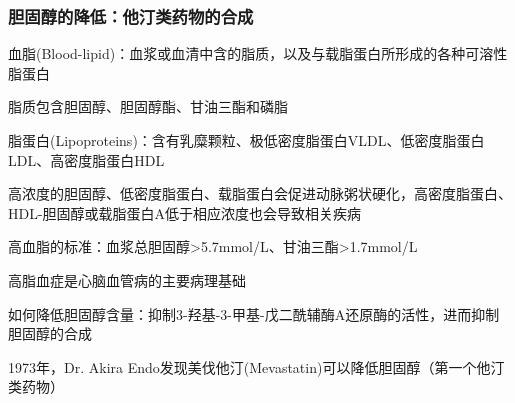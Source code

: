 \subsubsection*{胆固醇的降低：他汀类药物的合成}%
\label{subsub:胆固醇的降低-他汀类药物的合成}
\begin{notation}
    血脂(Blood-lipid)：血浆或血清中含的脂质，以及与载脂蛋白所形成的各种可溶性脂蛋白

    脂质包含胆固醇、胆固醇酯、甘油三酯和磷脂
\end{notation}
\begin{notation}
    脂蛋白(Lipoproteins)：含有乳糜颗粒、极低密度脂蛋白VLDL、低密度脂蛋白LDL、高密度脂蛋白HDL

    高浓度的胆固醇、低密度脂蛋白、载脂蛋白会促进动脉粥状硬化，高密度脂蛋白、HDL-胆固醇或载脂蛋白A低于相应浓度也会导致相关疾病
\end{notation}
\begin{notation}
    高血脂的标准：血浆总胆固醇>5.7mmol/L、甘油三酯>1.7mmol/L

    高脂血症是心脑血管病的主要病理基础

    如何降低胆固醇含量：抑制3-羟基-3-甲基-戊二酰辅酶A还原酶的活性，进而抑制胆固醇的合成

    1973年，Dr. Akira Endo发现美伐他汀(Mevastatin)可以降低胆固醇（第一个他汀类药物）
\end{notation}



